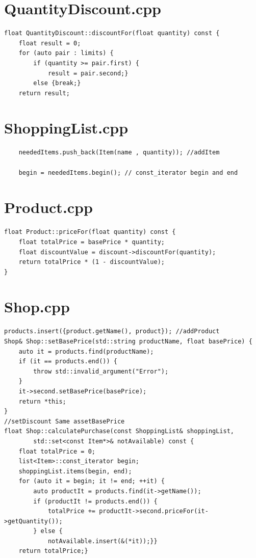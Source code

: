 \documentclass[8pt,twocolumn]{extarticle}
\begin{document}
\section*{QuantityDiscount.cpp}
\begin{lstlisting}
float QuantityDiscount::discountFor(float quantity) const {
	float result = 0;
	for (auto pair : limits) {
		if (quantity >= pair.first) {
			result = pair.second;} 
        else {break;}
	return result;
\end{lstlisting}

\section*{ShoppingList.cpp}
\begin{lstlisting}
	neededItems.push_back(Item(name , quantity)); //addItem

	begin = neededItems.begin(); // const_iterator begin and end
\end{lstlisting}

\section*{Product.cpp}
\begin{lstlisting}
float Product::priceFor(float quantity) const {
	float totalPrice = basePrice * quantity;
	float discountValue = discount->discountFor(quantity);
	return totalPrice * (1 - discountValue);
}
\end{lstlisting}

\section*{Shop.cpp}
\begin{lstlisting}
products.insert({product.getName(), product}); //addProduct
Shop& Shop::setBasePrice(std::string productName, float basePrice) {
	auto it = products.find(productName);
	if (it == products.end()) {
		throw std::invalid_argument("Error");
	}
	it->second.setBasePrice(basePrice);
	return *this;
}
//setDiscount Same assetBasePrice
float Shop::calculatePurchase(const ShoppingList& shoppingList,
		std::set<const Item*>& notAvailable) const {
    float totalPrice = 0;
    list<Item>::const_iterator begin;
    shoppingList.items(begin, end);
    for (auto it = begin; it != end; ++it) {
        auto productIt = products.find(it->getName());
        if (productIt != products.end()) {
            totalPrice += productIt->second.priceFor(it->getQuantity());
        } else {
            notAvailable.insert(&(*it));}}
    return totalPrice;}
\end{lstlisting}
\end{document}
